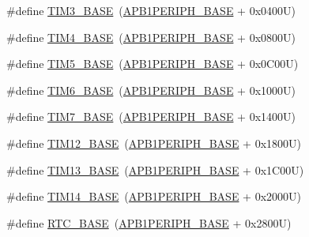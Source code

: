 \begin{DoxyCompactItemize}
\item 
\#define \hyperlink{group___peripheral__memory__map_gaf0c34a518f87e1e505cd2332e989564a}{T\+I\+M3\+\_\+\+B\+A\+SE}~(\hyperlink{group___peripheral__memory__map_ga45666d911f39addd4c8c0a0ac3388cfb}{A\+P\+B1\+P\+E\+R\+I\+P\+H\+\_\+\+B\+A\+SE} + 0x0400\+U)
\item 
\#define \hyperlink{group___peripheral__memory__map_ga56e2d44b0002f316527b8913866a370d}{T\+I\+M4\+\_\+\+B\+A\+SE}~(\hyperlink{group___peripheral__memory__map_ga45666d911f39addd4c8c0a0ac3388cfb}{A\+P\+B1\+P\+E\+R\+I\+P\+H\+\_\+\+B\+A\+SE} + 0x0800\+U)
\item 
\#define \hyperlink{group___peripheral__memory__map_ga3e1671477190d065ba7c944558336d7e}{T\+I\+M5\+\_\+\+B\+A\+SE}~(\hyperlink{group___peripheral__memory__map_ga45666d911f39addd4c8c0a0ac3388cfb}{A\+P\+B1\+P\+E\+R\+I\+P\+H\+\_\+\+B\+A\+SE} + 0x0\+C00\+U)
\item 
\#define \hyperlink{group___peripheral__memory__map_ga8268ec947929f192559f28c6bf7d1eac}{T\+I\+M6\+\_\+\+B\+A\+SE}~(\hyperlink{group___peripheral__memory__map_ga45666d911f39addd4c8c0a0ac3388cfb}{A\+P\+B1\+P\+E\+R\+I\+P\+H\+\_\+\+B\+A\+SE} + 0x1000\+U)
\item 
\#define \hyperlink{group___peripheral__memory__map_ga0ebf54364c6a2be6eb19ded6b18b6387}{T\+I\+M7\+\_\+\+B\+A\+SE}~(\hyperlink{group___peripheral__memory__map_ga45666d911f39addd4c8c0a0ac3388cfb}{A\+P\+B1\+P\+E\+R\+I\+P\+H\+\_\+\+B\+A\+SE} + 0x1400\+U)
\item 
\#define \hyperlink{group___peripheral__memory__map_ga33dea32fadbaecea161c2ef7927992fd}{T\+I\+M12\+\_\+\+B\+A\+SE}~(\hyperlink{group___peripheral__memory__map_ga45666d911f39addd4c8c0a0ac3388cfb}{A\+P\+B1\+P\+E\+R\+I\+P\+H\+\_\+\+B\+A\+SE} + 0x1800\+U)
\item 
\#define \hyperlink{group___peripheral__memory__map_gad20f79948e9359125a40bbf6ed063590}{T\+I\+M13\+\_\+\+B\+A\+SE}~(\hyperlink{group___peripheral__memory__map_ga45666d911f39addd4c8c0a0ac3388cfb}{A\+P\+B1\+P\+E\+R\+I\+P\+H\+\_\+\+B\+A\+SE} + 0x1\+C00\+U)
\item 
\#define \hyperlink{group___peripheral__memory__map_ga862855347d6e1d92730dfe17ee8e90b8}{T\+I\+M14\+\_\+\+B\+A\+SE}~(\hyperlink{group___peripheral__memory__map_ga45666d911f39addd4c8c0a0ac3388cfb}{A\+P\+B1\+P\+E\+R\+I\+P\+H\+\_\+\+B\+A\+SE} + 0x2000\+U)
\item 
\#define \hyperlink{group___peripheral__memory__map_ga4265e665d56225412e57a61d87417022}{R\+T\+C\+\_\+\+B\+A\+SE}~(\hyperlink{group___peripheral__memory__map_ga45666d911f39addd4c8c0a0ac3388cfb}{A\+P\+B1\+P\+E\+R\+I\+P\+H\+\_\+\+B\+A\+SE} + 0x2800\+U)

\end{DoxyCompactItemize}
